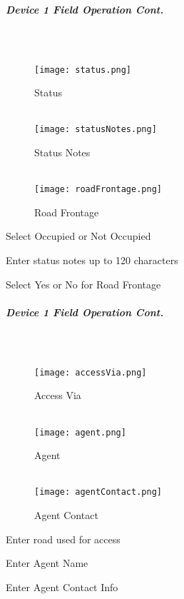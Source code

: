 \documentclass[class=article , crop=false, titlepage, twoside, multi={itemize, figure, verbatim}, float=false]{standalone}
\begin{document}
\clearpage
\subparagraph*{Device 1 Field Operation Cont.}
\subparagraph*{\\}
\begin{wrapfigure}{r}{0.5\textwidth}
\centering
\texttt{[image: status.png]}
\caption {Status}
\vspace{.2in}
\HRule \\[.4cm] %
\vspace{.2in}
\texttt{[image: statusNotes.png]}
\caption{Status Notes}
\vspace{.2in}
\HRule \\[.4cm] %
\vspace{.2in}
\texttt{[image: roadFrontage.png]}
\caption{Road Frontage}
\end{wrapfigure}
Select Occupied or Not Occupied\\
\vspace{3in}

\noindent Enter status notes up to 120 characters\\
\vspace{3in}

\noindent Select Yes or No for Road Frontage\\

\clearpage
\subparagraph*{Device 1 Field Operation Cont.}
\subparagraph*{\\}
\begin{wrapfigure}{r}{0.5\textwidth}
\centering
\texttt{[image: accessVia.png]}
\caption {Access Via}
\vspace{.2in}
\HRule \\[.4cm] %
\vspace{.2in}
\texttt{[image: agent.png]}
\caption{Agent}
\vspace{.2in}
\HRule \\[.4cm] %
\vspace{.2in}
\texttt{[image: agentContact.png]}
\caption{Agent Contact}
\end{wrapfigure}
Enter road used for access\\
\vspace{3in}

\noindent Enter Agent Name\\
\vspace{3in}

\noindent Enter Agent Contact Info\\
\end{document}
